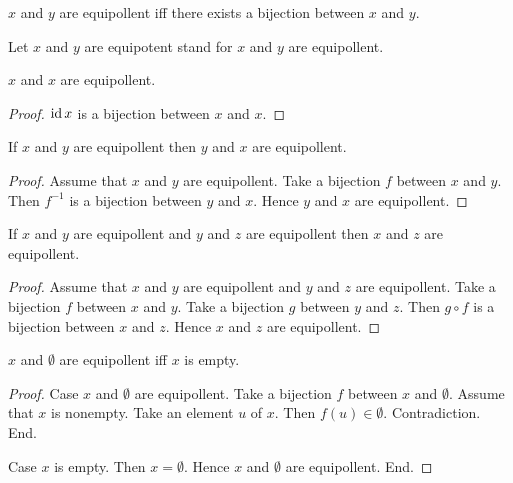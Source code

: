 \documentclass[../../set-theory.ftl.tex]{subfiles}
\begin{document}
  \begin{forthel}
    \begin{definition}
      $x$ and $y$ are equipollent iff there exists a bijection between $x$ and $y$.
    \end{definition}

    Let $x$ and $y$ are equipotent stand for $x$ and $y$ are equipollent.

    \begin{proposition}\label{SetTheory_02_06_639059}
      $x$ and $x$ are equipollent.
    \end{proposition}
    \begin{proof}
      $\operatorname{id}{x}$ is a bijection between $x$ and $x$.
    \end{proof}

    \begin{proposition}\label{SetTheory_02_06_467393}
      If $x$ and $y$ are equipollent then $y$ and $x$ are equipollent.
    \end{proposition}
    \begin{proof}
      Assume that $x$ and $y$ are equipollent.
      Take a bijection $f$ between $x$ and $y$.
      Then $f^{-1}$ is a bijection between $y$ and $x$.
      Hence $y$ and $x$ are equipollent.
    \end{proof}

    \begin{proposition}\label{SetTheory_02_06_956273}
      If $x$ and $y$ are equipollent and $y$ and $z$ are equipollent then $x$ and $z$ are equipollent.
    \end{proposition}
    \begin{proof}
      Assume that $x$ and $y$ are equipollent and $y$ and $z$ are equipollent.
      Take a bijection $f$ between $x$ and $y$.
      Take a bijection $g$ between $y$ and $z$.
      Then $g \circ f$ is a bijection between $x$ and $z$.
      Hence $x$ and $z$ are equipollent.
    \end{proof}

    \begin{proposition}\label{SetTheory_02_06_430789}
      $x$ and $\emptyset$ are equipollent iff $x$ is empty.
    \end{proposition}
    \begin{proof}
      Case $x$ and $\emptyset$ are equipollent.
        Take a bijection $f$ between $x$ and $\emptyset$.
        Assume that $x$ is nonempty.
        Take an element $u$ of $x$.
        Then $f(u) \in \emptyset$.
        Contradiction.
      End.

      Case $x$ is empty.
        Then $x = \emptyset$.
        Hence $x$ and $\emptyset$ are equipollent.
      End.
    \end{proof}
  \end{forthel}
\end{document}
